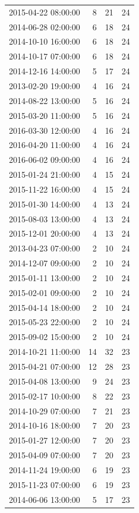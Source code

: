 \begin{tabular}{lrrr}
2015-04-22 08:00:00 & 8 & 21 & 24 \\
2014-06-28 02:00:00 & 6 & 18 & 24 \\
2014-10-10 16:00:00 & 6 & 18 & 24 \\
2014-10-17 07:00:00 & 6 & 18 & 24 \\
2014-12-16 14:00:00 & 5 & 17 & 24 \\
2013-02-20 19:00:00 & 4 & 16 & 24 \\
2014-08-22 13:00:00 & 5 & 16 & 24 \\
2015-03-20 11:00:00 & 5 & 16 & 24 \\
2016-03-30 12:00:00 & 4 & 16 & 24 \\
2016-04-20 11:00:00 & 4 & 16 & 24 \\
2016-06-02 09:00:00 & 4 & 16 & 24 \\
2015-01-24 21:00:00 & 4 & 15 & 24 \\
2015-11-22 16:00:00 & 4 & 15 & 24 \\
2015-01-30 14:00:00 & 4 & 13 & 24 \\
2015-08-03 13:00:00 & 4 & 13 & 24 \\
2015-12-01 20:00:00 & 4 & 13 & 24 \\
2013-04-23 07:00:00 & 2 & 10 & 24 \\
2014-12-07 09:00:00 & 2 & 10 & 24 \\
2015-01-11 13:00:00 & 2 & 10 & 24 \\
2015-02-01 09:00:00 & 2 & 10 & 24 \\
2015-04-14 18:00:00 & 2 & 10 & 24 \\
2015-05-23 22:00:00 & 2 & 10 & 24 \\
2015-09-02 15:00:00 & 2 & 10 & 24 \\
2014-10-21 11:00:00 & 14 & 32 & 23 \\
2015-04-21 07:00:00 & 12 & 28 & 23 \\
2015-04-08 13:00:00 & 9 & 24 & 23 \\
2015-02-17 10:00:00 & 8 & 22 & 23 \\
2014-10-29 07:00:00 & 7 & 21 & 23 \\
2014-10-16 18:00:00 & 7 & 20 & 23 \\
2015-01-27 12:00:00 & 7 & 20 & 23 \\
2015-04-09 07:00:00 & 7 & 20 & 23 \\
2014-11-24 19:00:00 & 6 & 19 & 23 \\
2015-11-23 07:00:00 & 6 & 19 & 23 \\
2014-06-06 13:00:00 & 5 & 17 & 23 \\

\end{tabular}
